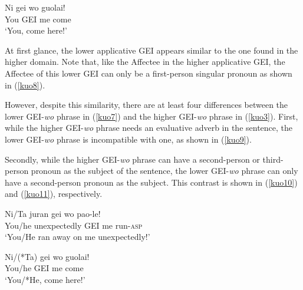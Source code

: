 \documentclass[output=paper,colorlinks,citecolor=brown]{langscibook}
\begin{document}
\ea
\label{kuo7}
\gll Ni     gei wo  guolai!\\  
     You    GEI me  come\\ 
\glt `You, come here!'
\z

At first glance, the lower applicative GEI appears similar to the one found in the higher domain. Note that, like the Affectee in the higher applicative GEI, the Affectee of this lower GEI can only be a first-person singular pronoun as shown in (\ref{kuo8}).

\z

However, despite this similarity, there are at least four differences between the lower GEI-\textit{wo} phrase in (\ref{kuo7}) and the higher GEI-\textit{wo} phrase in (\ref{kuo3}). First, while the higher GEI-\textit{wo} phrase needs an evaluative adverb in the sentence, the lower GEI-\textit{wo} phrase is incompatible with one, as shown in (\ref{kuo9}).

\z

Secondly, while the higher GEI-\textit{wo} phrase can have a second-person or third-person pronoun as the subject of the sentence, the lower GEI-\textit{wo} phrase can only have a second-person pronoun as the subject. This contrast is shown in (\ref{kuo10}) and (\ref{kuo11}), respectively.

\ea
\label{kuo10}
\gll Ni/Ta  juran           gei wo  pao-le!\\  
     You/he unexpectedly    GEI me  run-\textsc{asp}\\ 
\glt `You/He ran away on me unexpectedly!'
\z

\ea
\label{kuo11}
\gll Ni/(*Ta)   gei wo  guolai!\\  
     You/he     GEI me  come\\ 
\glt `You/*He, come here!'
\z
\end{document}
